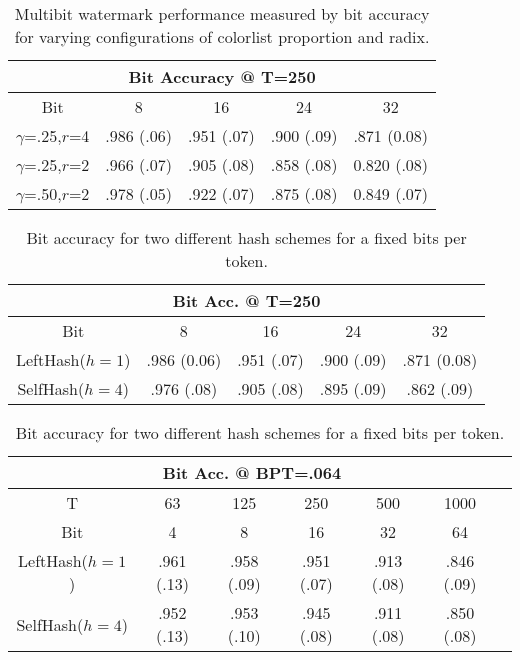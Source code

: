 \begin{table}[h]
\centering
\begin{tabular}{c|cccc}
    \toprule
    \multicolumn{5}{c}{\textbf{Bit Accuracy @ T=250}} \\ 
    \toprule
    Bit &  8  &  16 &  24  &  32 \\
    \toprule
    $\gamma$=.25,$r$=4& .986 (.06) & .951 (.07) & .900 (.09)  & .871 (0.08) \\
    $\gamma$=.25,$r$=2& .966 (.07)  & .905 (.08) & .858 (.08) & 0.820 (.08) \\
    $\gamma$=.50,$r$=2 & .978 (.05)  & .922 (.07) & .875 (.08) & 0.849 (.07)   \\
    \bottomrule
\end{tabular}
\caption{Multibit watermark performance measured by bit accuracy for varying configurations of colorlist proportion and radix.}\label{tab:clean-radix}

\end{table}


\begin{table}[ht!]
\centering
\begin{tabular}{c|cccc}
    \toprule
    \multicolumn{5}{c}{\textbf{Bit Acc. @ T=250}} \\ 
    \toprule
    Bit &  8  &  16 &  24  &  32 \\
    \toprule
    LeftHash($h=1$) & .986 (0.06) & .951 (.07) & .900 (.09) & .871 (0.08)   \\
    SelfHash($h=4$) & .976 (.08)  & .905 (.08) & .895 (.09) & .862 (.09)    \\ 
    \bottomrule
\end{tabular}
\caption{Bit accuracy for two different hash schemes for a fixed token length.}\label{tab:fixedT}

\begin{tabular}{c|cccccc}
    \toprule
    \multicolumn{6}{c}{\textbf{Bit Acc. @ BPT=.064}} \\ 
    \toprule
    T &  63  & 125 &  250  &  500 &  1000 \\
    Bit & 4 &  8 & 16  & 32 & 64 \\
    \toprule
   LeftHash($h=1$) & .961 (.13)  & .958 (.09)   & .951 (.07)   & .913 (.08) & .846 (.09) \\
   SelfHash($h=4$) & .952 (.13)  & .953 (.10) & .945 (.08) & .911 (.08)  & .850 (.08) \\
    \bottomrule
\end{tabular}
\caption{Bit accuracy for two different hash schemes for a fixed bits per token.}
\label{tab:bpt}
\vspace{-1mm}
\end{table}


